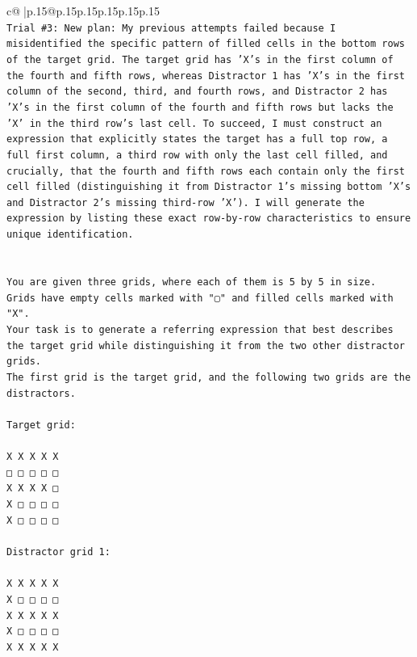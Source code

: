 \documentclass{article}
\begin{document}
{\begin{supertabular}{c@{$\;$}|p{.15\linewidth}@{}p{.15\linewidth}p{.15\linewidth}p{.15\linewidth}p{.15\linewidth}p{.15\linewidth}}
{{{\\ 
\texttt{Trial \#3: New plan: My previous attempts failed because I misidentified the specific pattern of filled cells in the bottom rows of the target grid. The target grid has 'X's in the first column of the fourth and fifth rows, whereas Distractor 1 has 'X's in the first column of the second, third, and fourth rows, and Distractor 2 has 'X's in the first column of the fourth and fifth rows but lacks the 'X' in the third row's last cell. To succeed, I must construct an expression that explicitly states the target has a full top row, a full first column, a third row with only the last cell filled, and crucially, that the fourth and fifth rows each contain only the first cell filled (distinguishing it from Distractor 1's missing bottom 'X's and Distractor 2's missing third{-}row 'X'). I will generate the expression by listing these exact row{-}by{-}row characteristics to ensure unique identification.} \\
\\ 
\\ 
\texttt{You are given three grids, where each of them is 5 by 5 in size.} \\
\texttt{Grids have empty cells marked with "▢" and filled cells marked with "X".} \\
\texttt{Your task is to generate a referring expression that best describes the target grid while distinguishing it from the two other distractor grids.} \\
\texttt{The first grid is the target grid, and the following two grids are the distractors.} \\
\\ 
\texttt{Target grid:} \\
\\ 
\texttt{X X X X X} \\
\texttt{□ □ □ □ □} \\
\texttt{X X X X □} \\
\texttt{X □ □ □ □} \\
\texttt{X □ □ □ □} \\
\\ 
\texttt{Distractor grid 1:} \\
\\ 
\texttt{X X X X X} \\
\texttt{X □ □ □ □} \\
\texttt{X X X X X} \\
\texttt{X □ □ □ □} \\
\texttt{X X X X X} \\
\\ 
}}}
\end{supertabular}}
\end{document}
